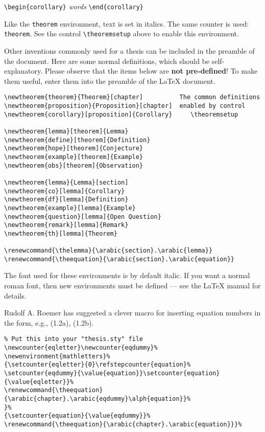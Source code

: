 \medskip

\verb|\begin{corollary}| {\em words} \verb|\end{corollary}|

\noindent Like the {\tt theorem} environment, text is set in italics.
The same counter is used: {\tt theorem}. See the control
\verb|\theoremsetup| above to enable this environment.

\noindent Other inventions commonly used for a thesis can be included in
the preamble of the document. Here are some normal definitions, which
should be self-explanatory. Please observe that the items below are {\bf
not pre-defined}! To make them useful, enter them into the preamble of
the \LaTeX{} document.

\begin{verbatim}
\newtheorem{theorem}{Theorem}[chapter]          The common definitions
\newtheorem{proposition}{Proposition}[chapter]  enabled by control
\newtheorem{corollary}[proposition]{Corollary}     \theoremsetup

\newtheorem{lemma}[theorem]{Lemma}
\newtheorem{define}[theorem]{Definition}
\newtheorem{hope}[theorem]{Conjecture}
\newtheorem{example}[theorem]{Example}
\newtheorem{obs}[theorem]{Observation}

\newtheorem{lemma}{Lemma}[section]
\newtheorem{co}[lemma]{Corollary}
\newtheorem{df}[lemma]{Definition}
\newtheorem{example}[lemma]{Example}
\newtheorem{question}[lemma]{Open Question}
\newtheorem{remark}[lemma]{Remark}
\newtheorem{th}[lemma]{Theorem}

\renewcommand{\thelemma}{\arabic{section}.\arabic{lemma}}
\renewcommand{\theequation}{\arabic{section}.\arabic{equation}}
\end{verbatim}

\noindent The font used for these environments is by default italic. If
you want a normal roman font, then new environments must be defined ---
see the \LaTeX{} manual for details.

\medskip

\noindent
Rudolf A. Roemer has suggested a clever macro for inserting
equation numbers in the form, e.g., (1.2a), (1.2b).
\begin{verbatim}
% Put this into your "thesis.sty" file
\newcounter{eqletter}\newcounter{eqdummy}%
\newenvironment{mathletters}%
{\setcounter{eqletter}{0}\refstepcounter{equation}%
\setcounter{eqdummy}{\value{equation}}\setcounter{equation}{\value{eqletter}}%
\renewcommand{\theequation}{\arabic{chapter}.\arabic{eqdummy}\alph{equation}}%
}%
{\setcounter{equation}{\value{eqdummy}}%
\renewcommand{\theequation}{\arabic{chapter}.\arabic{equation}}}%
\end{verbatim}

